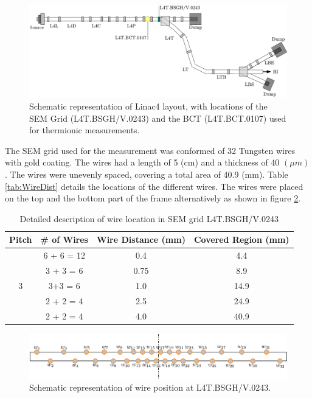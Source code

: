 \begin{figure}[h]
    \centering
    \includegraphics[width=0.90\columnwidth]{Figure_RelativePositionSemBCT/DetPosition.pdf}
    \caption{Schematic representation of Linac4 layout, with locations of the SEM Grid (L4T.BSGH/V.0243) and the BCT (L4T.BCT.0107) used for thermionic measurements.}
    \label{fig:DetLocation}
\end{figure}

The SEM grid used for the measurement was conformed of 32 Tungsten wires with gold coating. The wires had a length of 5 (cm) and a thickness of 40 $(\mu m)$. The wires were unevenly spaced, covering a total area of 40.9 (mm). Table \ref{tab:WireDist} details the locations of the different wires. The wires were placed on the top and the bottom part of the frame alternatively as shown in figure \ref{fig:WireLocation}.

\begin{table}[h]
    \centering
    \begin{tabular}{cccc}
    \hline
    Pitch              & \# of Wires & Wire Distance (mm) & Covered Region (mm) \\ \hline
    \multirow{5}{*}{3} & 6 + 6 = 12  & 0.4                & 4.4                 \\
                       & 3 + 3 = 6   & 0.75               & 8.9                 \\
                       & 3+3 = 6     & 1.0                & 14.9                \\
                       & 2 + 2 = 4   & 2.5                & 24.9                \\
                       & 2 + 2 = 4   & 4.0                & 40.9                \\ \hline
    \end{tabular}
    \label{tab:WireSpacing}
    \caption{Detailed description of wire location in SEM grid L4T.BSGH/V.0243}
\end{table}


\begin{figure}[h]
    \centering
    \includegraphics[width=0.90\columnwidth]{Figure_SemGridSchema/SemGridSchema.pdf}
    \caption{Schematic representation of wire position at L4T.BSGH/V.0243. }
    \label{fig:WireLocation}
\end{figure}

